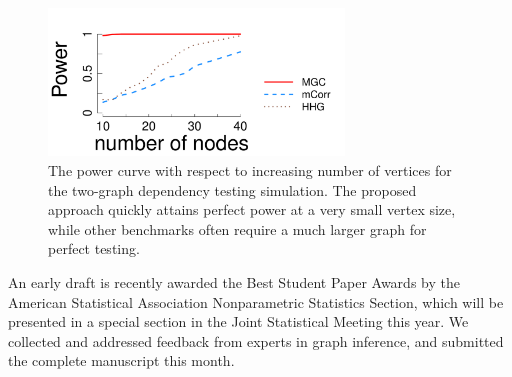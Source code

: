 \documentclass[simplex.tex]{subfiles}
\begin{document}
\begin{figure}[h!]
\begin{cframed}
		\centering
		\includegraphics[width=0.7\textwidth]{../../figs/twoGraphs1.pdf}
		\caption{The power curve with respect to increasing number of vertices for the two-graph dependency testing simulation. The proposed approach quickly attains perfect power at a very small vertex size, while other benchmarks often require a much larger graph for perfect testing. }
		\label{fig:threeSBM201703}
		\end{cframed}
\end{figure}

An early draft is recently awarded the Best Student Paper Awards by the American Statistical Association Nonparametric Statistics Section, which will be presented in a special section in the Joint Statistical Meeting this year. We collected and addressed feedback from experts in graph inference, and submitted the complete manuscript this month.
%

\clearpage
\end{document}
